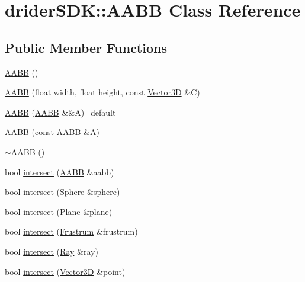 \hypertarget{classdrider_s_d_k_1_1_a_a_b_b}{}\section{drider\+S\+DK\+:\+:A\+A\+BB Class Reference}
\label{classdrider_s_d_k_1_1_a_a_b_b}
\subsection*{Public Member Functions}
\begin{DoxyCompactItemize}
\item 
\hyperlink{classdrider_s_d_k_1_1_a_a_b_b_a290a97c9263d9216f3730c331b24af23}{A\+A\+BB} ()
\item 
\hyperlink{classdrider_s_d_k_1_1_a_a_b_b_a01d474019eb0b1335969de2e36f93fc3}{A\+A\+BB} (float width, float height, const \hyperlink{classdrider_s_d_k_1_1_vector3_d}{Vector3D} \&C)
\item 
\hyperlink{classdrider_s_d_k_1_1_a_a_b_b_a3e8b4fa845074e25f57d0cd6162040db}{A\+A\+BB} (\hyperlink{classdrider_s_d_k_1_1_a_a_b_b}{A\+A\+BB} \&\&A)=default
\item 
\hyperlink{classdrider_s_d_k_1_1_a_a_b_b_a773ae21f2364a88f05338f43c1eda251}{A\+A\+BB} (const \hyperlink{classdrider_s_d_k_1_1_a_a_b_b}{A\+A\+BB} \&A)
\item 
\hyperlink{classdrider_s_d_k_1_1_a_a_b_b_af00f8678f29ff866dde208221f2baf0f}{$\sim$\+A\+A\+BB} ()
\item 
bool \hyperlink{classdrider_s_d_k_1_1_a_a_b_b_aad011cc0c9bafb8fee5e0590935686ab}{intersect} (\hyperlink{classdrider_s_d_k_1_1_a_a_b_b}{A\+A\+BB} \&aabb)
\item 
bool \hyperlink{classdrider_s_d_k_1_1_a_a_b_b_a30da617eda34d0a0396c00cad6bb11fa}{intersect} (\hyperlink{classdrider_s_d_k_1_1_sphere}{Sphere} \&sphere)
\item 
bool \hyperlink{classdrider_s_d_k_1_1_a_a_b_b_af01eb8270121bccab4eb7a891639ba27}{intersect} (\hyperlink{classdrider_s_d_k_1_1_plane}{Plane} \&plane)
\item 
bool \hyperlink{classdrider_s_d_k_1_1_a_a_b_b_a286eedcd8bffca3d22d87f21aab432b1}{intersect} (\hyperlink{classdrider_s_d_k_1_1_frustrum}{Frustrum} \&frustrum)
\item 
bool \hyperlink{classdrider_s_d_k_1_1_a_a_b_b_ad52284fbf96cf41b06d23e05b59df235}{intersect} (\hyperlink{classdrider_s_d_k_1_1_ray}{Ray} \&ray)
\item 
bool \hyperlink{classdrider_s_d_k_1_1_a_a_b_b_a267f402755230b75e2148ea279360593}{intersect} (\hyperlink{classdrider_s_d_k_1_1_vector3_d}{Vector3D} \&point)
\end{DoxyCompactItemize}
